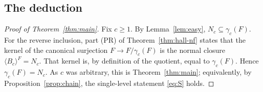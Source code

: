 \documentclass{amsart}
\theoremstyle{definition}
\theoremstyle{remark}
\begin{document}
\subsection*{The deduction}

\begin{proof}[Proof of Theorem~\ref{thm:main}]
Fix $c\ge1$. By Lemma~\ref{lem:easy}, $N_c\subseteq\gamma_c(F)$. For the reverse
inclusion, part (PR) of Theorem~\ref{thm:hall-nf} states that the kernel of the
canonical surjection $F\to F/\gamma_c(F)$ is the normal closure $\langle
B_c\rangle^{F}=N_c$. That kernel is, by definition of the quotient, equal to
$\gamma_c(F)$. Hence $\gamma_c(F)=N_c$. As $c$ was arbitrary, this is
Theorem~\ref{thm:main}; equivalently, by Proposition~\ref{prop:chain}, the single-level
statement \eqref{eq:S} holds.
\end{proof}
\end{document}

